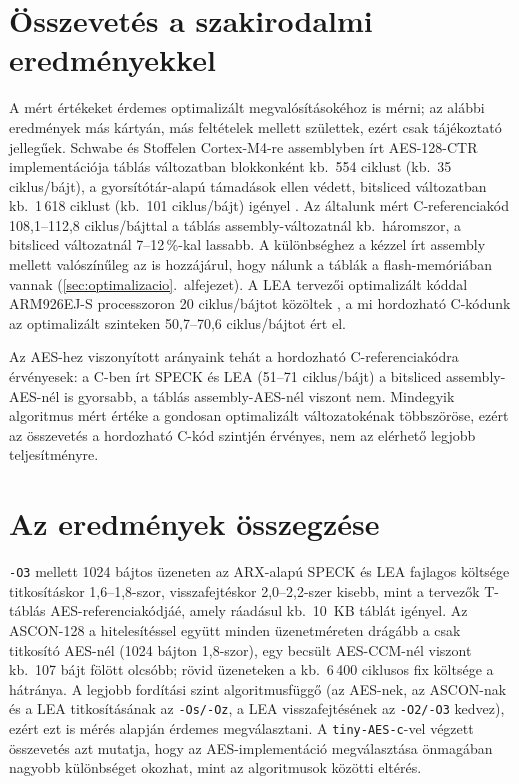 \documentclass[a4paper,12pt]{report}
\theoremstyle{definition}
\theoremstyle{remark}
\begin{document}
\section{Összevetés a szakirodalmi eredményekkel}\label{sec:irodalmi_osszevetes}

A mért értékeket érdemes optimalizált megvalósításokéhoz is mérni; az alábbi eredmények más kártyán, más feltételek mellett születtek, ezért csak tájékoztató jellegűek. Schwabe és Stoffelen Cortex-M4-re assemblyben írt AES-128-CTR implementációja táblás változatban blokkonként kb.\ 554 ciklust (kb.\ 35 ciklus/bájt), a gyorsítótár-alapú támadások ellen védett, bitsliced változatban kb.\ 1\,618 ciklust (kb.\ 101 ciklus/bájt) igényel \cite{SchwabeStoffelen2017}. Az általunk mért C-referenciakód 108,1--112,8 ciklus/bájttal a táblás assembly-változatnál kb.\ háromszor, a bitsliced változatnál 7--12\,\%-kal lassabb. A különbséghez a kézzel írt assembly mellett valószínűleg az is hozzájárul, hogy nálunk a táblák a flash-memóriában vannak (\ref{sec:optimalizacio}.~alfejezet). A LEA tervezői optimalizált kóddal ARM926EJ-S processzoron 20 ciklus/bájtot közöltek \cite{Hong2013}, a mi hordozható C-kódunk az optimalizált szinteken 50,7--70,6 ciklus/bájtot ért el.

Az AES-hez viszonyított arányaink tehát a hordozható C-referenciakódra érvényesek: a C-ben írt SPECK és LEA (51--71 ciklus/bájt) a bitsliced assembly-AES-nél is gyorsabb, a táblás assembly-AES-nél viszont nem. Mindegyik algoritmus mért értéke a gondosan optimalizált változatokénak többszöröse, ezért az összevetés a hordozható C-kód szintjén érvényes, nem az elérhető legjobb teljesítményre.

\section{Az eredmények összegzése}\label{sec:osszesites}

\texttt{-O3} mellett 1024 bájtos üzeneten az ARX-alapú SPECK és LEA fajlagos költsége titkosításkor 1,6--1,8-szor, visszafejtéskor 2,0--2,2-szer kisebb, mint a tervezők T-táblás AES-referenciakódjáé, amely ráadásul kb.\ 10~KB táblát igényel. Az ASCON-128 a hitelesítéssel együtt minden üzenetméreten drágább a csak titkosító AES-nél (1024 bájton 1,8-szor), egy becsült AES-CCM-nél viszont kb.\ 107 bájt fölött olcsóbb; rövid üzeneteken a kb.\ 6\,400 ciklusos fix költsége a hátránya. A legjobb fordítási szint algoritmusfüggő (az AES-nek, az ASCON-nak és a LEA titkosításának az \texttt{-Os/-Oz}, a LEA visszafejtésének az \texttt{-O2/-O3} kedvez), ezért ezt is mérés alapján érdemes megválasztani. A \texttt{tiny-AES-c}-vel végzett összevetés azt mutatja, hogy az AES-implementáció megválasztása önmagában nagyobb különbséget okozhat, mint az algoritmusok közötti eltérés.
\end{document}
